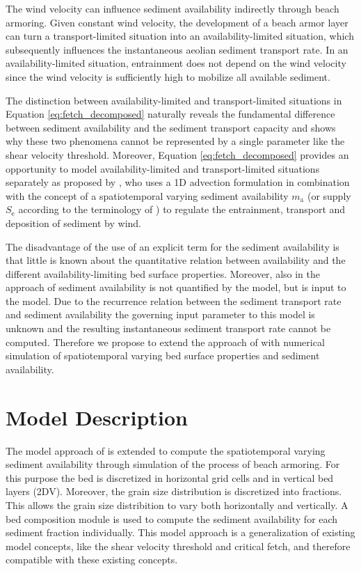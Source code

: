 \noindent The wind velocity can influence sediment availability
indirectly through beach armoring. Given constant wind velocity, the
development of a beach armor layer can turn a transport-limited
situation into an availability-limited situation, which subsequently
influences the instantaneous aeolian sediment transport rate.  In an
availability-limited situation, entrainment does not depend on the
wind velocity since the wind velocity is sufficiently high to mobilize
all available sediment.

The distinction between availability-limited and transport-limited
situations in Equation \ref{eq:fetch_decomposed} naturally reveals the
fundamental difference between sediment availability and the sediment
transport capacity and shows why these two phenomena cannot be
represented by a single parameter like the shear velocity
threshold. Moreover, Equation \ref{eq:fetch_decomposed} provides an
opportunity to model availability-limited and transport-limited
situations separately as proposed by \citet{deVries2014a}, who uses a
1D advection formulation in combination with the concept of a
spatiotemporal varying sediment availability $m_{\mathrm{a}}$ (or
supply $S_{\mathrm{e}}$ according to the terminology of
\citet{deVries2014a}) to regulate the entrainment, transport and
deposition of sediment by wind.

The disadvantage of the use of an explicit term for the sediment
availability is that little is known about the quantitative relation
between availability and the different availability-limiting bed
surface properties. Moreover, also in the approach of
\citet{deVries2014a} sediment availability is not quantified by the
model, but is input to the model. Due to the recurrence relation
between the sediment transport rate and sediment availability the
governing input parameter to this model is unknown and the resulting
instantaneous sediment transport rate cannot be computed. Therefore we
propose to extend the approach of \citet{deVries2014a} with numerical
simulation of spatiotemporal varying bed surface properties and
sediment availability. 

\section{Model Description}
\label{sec:model}

The model approach of \citet{deVries2014a} is extended to compute the
spatiotemporal varying sediment availability through simulation of the
process of beach armoring. For this purpose the bed is discretized in
horizontal grid cells and in vertical bed layers (2DV). Moreover, the
grain size distribution is discretized into fractions. This allows the
grain size distribition to vary both horizontally and vertically. A
bed composition module is used to compute the sediment availability
for each sediment fraction individually. This model approach is a
generalization of existing model concepts, like the shear velocity
threshold and critical fetch, and therefore compatible with these
existing concepts.

